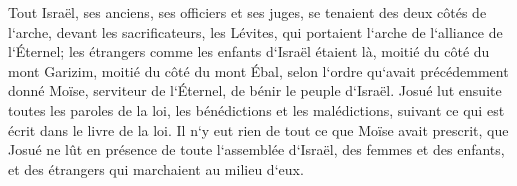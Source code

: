 \verse Tout Israël, ses anciens, ses officiers et ses juges, se tenaient des deux côtés de l`arche, devant les sacrificateurs, les Lévites, qui portaient l`arche de l`alliance de l`Éternel; les étrangers comme les enfants d`Israël étaient là, moitié du côté du mont Garizim, moitié du côté du mont Ébal, selon l`ordre qu`avait précédemment donné Moïse, serviteur de l`Éternel, de bénir le peuple d`Israël. 
\verse Josué lut ensuite toutes les paroles de la loi, les bénédictions et les malédictions, suivant ce qui est écrit dans le livre de la loi. 
\verse Il n`y eut rien de tout ce que Moïse avait prescrit, que Josué ne lût en présence de toute l`assemblée d`Israël, des femmes et des enfants, et des étrangers qui marchaient au milieu d`eux. 

\chapter{}

